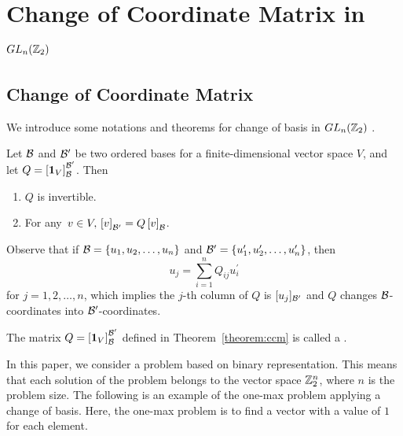 \section{Change of Coordinate Matrix in \texorpdfstring{$ GL_n(\mathbb{Z}_2) $}{GL\_{}n(Z\_{}2)}} \label{section:ccm_intro}

\subsection{Change of Coordinate Matrix}
We introduce some notations and theorems for change of basis in $ GL_n(\mathbb{Z}_2) $ \cite{friedberglinear}.

\begin{theorem} \label{theorem:ccm}
Let $ \mathcal{B} $ and $ \mathcal{B}^\prime $ be two ordered bases for a finite-dimensional vector space $ V $,
and let $ Q = \left[ \mathbf{1}_V \right]_{\mathcal{B}}^{\mathcal{B}^\prime} $. Then
\begin{enumerate}
    \item $ Q $ is invertible.
    \item For any $\, v \in V,\, \left[ v \right]_{\mathcal{B}^\prime} = Q \left[ v \right]_{\mathcal{B}} $.
\end{enumerate}
\end{theorem}

Observe that if $ \mathcal{B} = \left\{ u_1, u_2, \ldots, u_n \right\} $
and $ \mathcal{B}^\prime = \left\{ u_1^\prime, u_2^\prime, \ldots, u_n^\prime \right\} $,
then
\[ u_j = \sum_{i=1}^{n} { Q_{ij} u_i^\prime } \] for $ j = 1, 2, \ldots, n $,
which implies the $ j $-th column of $ Q $ is $ [ u_j ]_{\mathcal{B}^\prime} $ and $ Q $ changes $ \mathcal{B} $-coordinates into $ \mathcal{B}^\prime $-coordinates.

\begin{Definition}
The matrix $ Q = \left[ \mathbf{1}_V \right]_{\mathcal{B}}^{\mathcal{B}^\prime} $
defined in Theorem~\ref{theorem:ccm} is called a .
\end{Definition}

In this paper, we consider a problem based on binary representation.
This means that each solution of the problem belongs to the vector space $ \mathbb{Z}_2^n $,
where $ n $ is the problem size.
The following is an example of the one-max problem applying a change of basis.
Here, the one-max problem is to find a vector with a value of $ 1 $ for each element.

